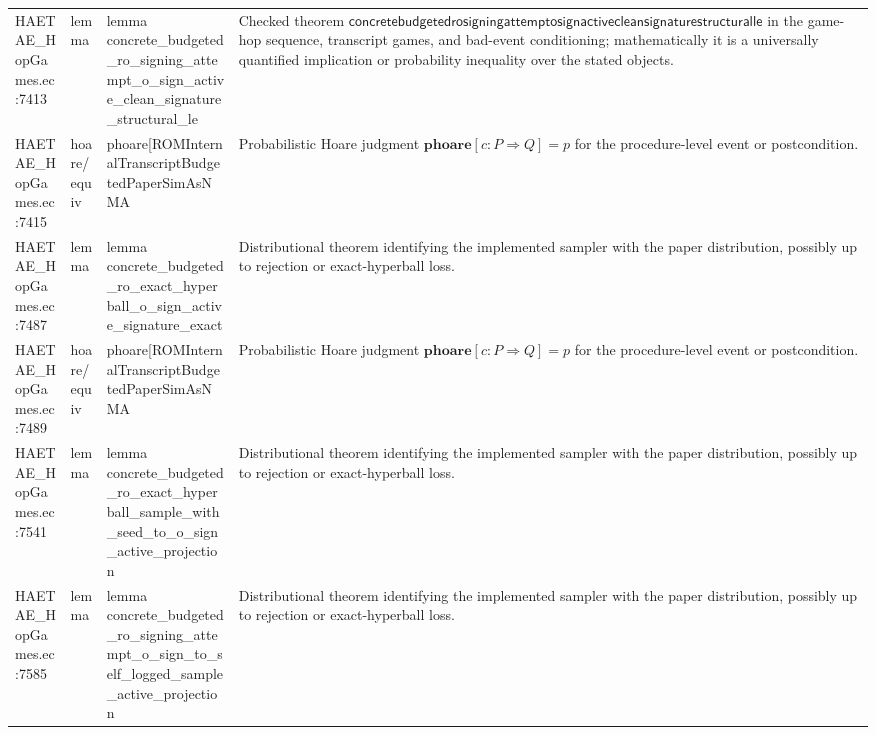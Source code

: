 \documentclass[10pt]{article}
\begin{document}
\begin{longtable}{L{0.11\textwidth}L{0.055\textwidth}L{0.385\textwidth}L{0.41\textwidth}}
HAETAE\_\allowbreak{}HopGames.\allowbreak{}ec:\allowbreak{}7413 & lemma & {\ttfamily\scriptsize lemma concrete\_\allowbreak{}budgeted\_\allowbreak{}ro\_\allowbreak{}signing\_\allowbreak{}attempt\_\allowbreak{}o\_\allowbreak{}sign\_\allowbreak{}active\_\allowbreak{}clean\_\allowbreak{}signature\_\allowbreak{}structural\_\allowbreak{}le} & Checked theorem $\mathsf{concretebudgetedrosigningattemptosignactivecleansignaturestructuralle}$ in the game-hop sequence, transcript games, and bad-event conditioning; mathematically it is a universally quantified implication or probability inequality over the stated objects. \\
HAETAE\_\allowbreak{}HopGames.\allowbreak{}ec:\allowbreak{}7415 & hoare/equiv & {\ttfamily\scriptsize phoare[ROMInternalTranscriptBudgetedPaperSimAsNMA} & Probabilistic Hoare judgment $\mathbf{phoare}[c:P\Rightarrow Q]=p$ for the procedure-level event or postcondition. \\
HAETAE\_\allowbreak{}HopGames.\allowbreak{}ec:\allowbreak{}7487 & lemma & {\ttfamily\scriptsize lemma concrete\_\allowbreak{}budgeted\_\allowbreak{}ro\_\allowbreak{}exact\_\allowbreak{}hyperball\_\allowbreak{}o\_\allowbreak{}sign\_\allowbreak{}active\_\allowbreak{}signature\_\allowbreak{}exact} & Distributional theorem identifying the implemented sampler with the paper distribution, possibly up to rejection or exact-hyperball loss. \\
HAETAE\_\allowbreak{}HopGames.\allowbreak{}ec:\allowbreak{}7489 & hoare/equiv & {\ttfamily\scriptsize phoare[ROMInternalTranscriptBudgetedPaperSimAsNMA} & Probabilistic Hoare judgment $\mathbf{phoare}[c:P\Rightarrow Q]=p$ for the procedure-level event or postcondition. \\
HAETAE\_\allowbreak{}HopGames.\allowbreak{}ec:\allowbreak{}7541 & lemma & {\ttfamily\scriptsize lemma concrete\_\allowbreak{}budgeted\_\allowbreak{}ro\_\allowbreak{}exact\_\allowbreak{}hyperball\_\allowbreak{}sample\_\allowbreak{}with\_\allowbreak{}seed\_\allowbreak{}to\_\allowbreak{}o\_\allowbreak{}sign\_\allowbreak{}active\_\allowbreak{}projection} & Distributional theorem identifying the implemented sampler with the paper distribution, possibly up to rejection or exact-hyperball loss. \\
HAETAE\_\allowbreak{}HopGames.\allowbreak{}ec:\allowbreak{}7585 & lemma & {\ttfamily\scriptsize lemma concrete\_\allowbreak{}budgeted\_\allowbreak{}ro\_\allowbreak{}signing\_\allowbreak{}attempt\_\allowbreak{}o\_\allowbreak{}sign\_\allowbreak{}to\_\allowbreak{}self\_\allowbreak{}logged\_\allowbreak{}sample\_\allowbreak{}active\_\allowbreak{}projection} & Distributional theorem identifying the implemented sampler with the paper distribution, possibly up to rejection or exact-hyperball loss. \\

\end{longtable}
\end{document}
